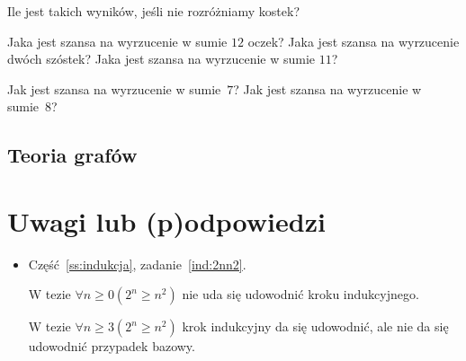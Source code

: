 \documentclass[12pt]{article}
\begin{document}
\begin{enumerate}
    Ile jest takich wyników, jeśli nie rozróżniamy kostek?
    
    Jaka jest szansa na wyrzucenie w sumie $12$ oczek? Jaka jest 
    szansa na wyrzucenie dwóch szóstek?
    Jaka jest szansa na wyrzucenie w sumie $11$?
    
    Jak jest szansa na wyrzucenie w sumie~$7$?
    Jak jest szansa na wyrzucenie w sumie~$8$?
\end{enumerate}


\subsection{Teoria grafów}

\section{Uwagi lub (p)odpowiedzi}


\begin{itemize}
    \item Część~\ref{ss:indukcja}, zadanie~\ref{ind:2nn2}. 
     
     W tezie $\forall n\geq 0 (2^n\geq n^2)$ nie uda się 
     udowodnić kroku indukcyjnego.
     
     W tezie $\forall n\geq 3 (2^n\geq n^2)$ krok indukcyjny da się udowodnić, ale nie da się udowodnić przypadek bazowy.
\end{itemize}



\end{document}
